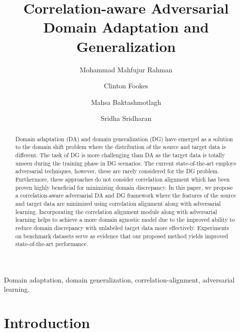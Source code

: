 \documentclass[review]{elsarticle}
\begin{document}
\begin{frontmatter}

\title{Correlation-aware Adversarial Domain Adaptation and Generalization}


\author[1]{Mohammad Mahfujur Rahman  }
\author[1]{Clinton Fookes}
\author[2]{Mahsa Baktashmotlagh}
\author[1]{Sridha Sridharan}

\address[1]{Speech, Audio, Image and Video Technology (SAIVT) Laboratory - Queensland University of Technology - 2 George Street, Brisbane, QLD 4000, Australia}
\address[2]{University of Queensland
- Saint Lucia, QLD 4072, Australia}


\begin{abstract}
Domain adaptation (DA) and domain generalization (DG) have emerged as a solution to the domain shift problem where the distribution of the source and target data is different. The task of DG is more challenging than DA as the target data is totally unseen during the training phase in DG scenarios. The current state-of-the-art employs adversarial techniques, however, these are rarely considered for the DG problem. Furthermore, these approaches do not consider correlation alignment which has been proven highly beneficial for minimizing domain discrepancy. In this paper, we propose a correlation-aware adversarial DA and DG framework where the features of the source and target data are minimized using correlation alignment along with adversarial learning. Incorporating the correlation alignment module along with adversarial learning helps to achieve a more domain agnostic model due to the improved ability to reduce domain discrepancy with unlabeled target data more effectively. Experiments on benchmark datasets serve as evidence that our proposed method yields improved state-of-the-art performance.
\end{abstract}

\begin{keyword}
Domain adaptation, domain generalization, correlation-alignment, adversarial learning.
\end{keyword}
\end{frontmatter}



\section{Introduction}
\end{document}
